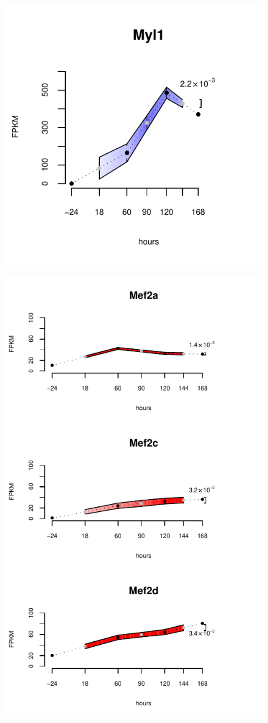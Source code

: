 \documentclass[12pt]{amsart}
\theoremstyle{definition}
\begin{document}
\newpage
\begin{figure}[!ht] 
    \includegraphics{pdfs/Myl1.pdf}
\end{figure}
\begin{figure}[!ht] 
    \includegraphics{pdfs/Mef2.pdf}
\end{figure}

\newpage


\end{document}
